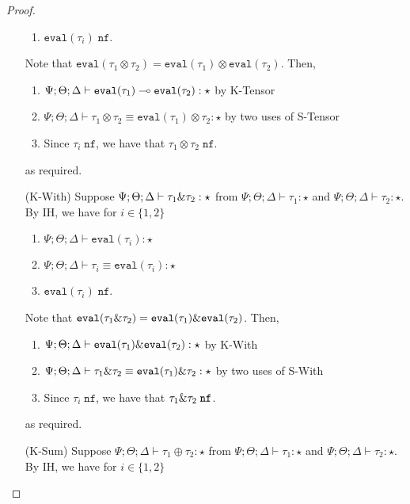 \begin{proof}
\begin{enumerate}
\begin{enumerate}[1.]
    \item $\texttt{eval}(\tau_i) \; \texttt{nf}$.
  \end{enumerate}
  Note that $\texttt{eval}(\tau_1 \otimes \tau_2) = \texttt{eval}(\tau_1) \otimes \texttt{eval}(\tau_2)$. Then,
  \begin{enumerate}[1.]
    \item ${\Psi ; \Theta ; \Delta \vdash \texttt{eval}(\tau_1) \multimap \texttt{eval}(\tau_2) : \star}$ by K-Tensor
    \item $\Psi ; \Theta ; \Delta \vdash \tau_1 \otimes \tau_2 \equiv \texttt{eval}(\tau_1) \otimes \tau_2 : \star$ by two uses of S-Tensor
    \item Since $\tau_i \; \texttt{nf}$, we have that $\tau_1 \otimes \tau_2 \; \texttt{nf}$.
  \end{enumerate}
  as required.
  \item[(K-With)] Suppose ${\Psi ; \Theta ; \Delta \vdash \tau_1 \& \tau_2 : \star}$ from $\Psi ; \Theta ; \Delta \vdash \tau_1 : \star$ and  $\Psi ; \Theta ; \Delta \vdash \tau_2 : \star$. By IH, we have for $i \in \{1,2\}$
  \begin{enumerate}[1.]
    \item $\Psi ; \Theta ; \Delta \vdash \texttt{eval}(\tau_i) : \star$
    \item $\Psi ; \Theta ; \Delta \vdash \tau_i \equiv \texttt{eval}(\tau_i) : \star$
    \item $\texttt{eval}(\tau_i) \; \texttt{nf}$.
  \end{enumerate}
  Note that $\texttt{eval}(\tau_1 \& \tau_2) = \texttt{eval}(\tau_1) \& \texttt{eval}(\tau_2)$. Then,
  \begin{enumerate}[1.]
    \item ${\Psi ; \Theta ; \Delta \vdash \texttt{eval}(\tau_1) \& \texttt{eval}(\tau_2) : \star}$ by K-With
    \item $\Psi ; \Theta ; \Delta \vdash \tau_1 \& \tau_2 \equiv \texttt{eval}(\tau_1) \& \tau_2 : \star$ by two uses of S-With
    \item Since $\tau_i \; \texttt{nf}$, we have that $\tau_1 \& \tau_2 \; \texttt{nf}$.
  \end{enumerate}
  as required.
  \item[(K-Sum)] Suppose ${\Psi ; \Theta ; \Delta \vdash \tau_1 \oplus \tau_2 : \star}$ from $\Psi ; \Theta ; \Delta \vdash \tau_1 : \star$ and  $\Psi ; \Theta ; \Delta \vdash \tau_2 : \star$. By IH, we have for $i \in \{1,2\}$
  \begin{enumerate}[1.]

\end{enumerate}
\end{enumerate}
\end{proof}
